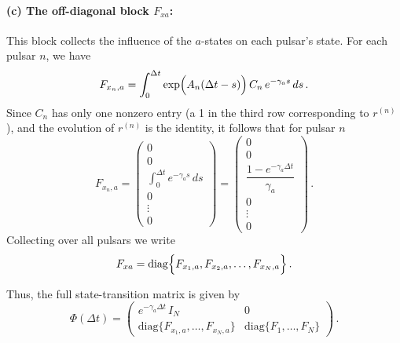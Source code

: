 \documentclass[]{scrartcl}
\begin{document}
	\paragraph{(c) The off-diagonal block \(F_{xa}\):}  
	This block collects the influence of the \(a\)-states on each pulsar’s state. For each pulsar \(n\), we have
	\begin{equation}
	F_{x_n,a} = \int_{0}^{\Delta t} \exp\Bigl(A_n (\Delta t-s)\Bigr) \, C_n \, e^{-\gamma_a s} \, ds\,.
	\end{equation}
	Since \(C_n\) has only one nonzero entry (a 1 in the third row corresponding to \(r^{(n)}\)), and the evolution of \(r^{(n)}\) is the identity, it follows that for pulsar \(n\)
	\begin{equation}
	F_{x_n,a} = \begin{pmatrix}
	0 \\[1mm]
	0 \\[1mm]
	\displaystyle \int_{0}^{\Delta t} e^{-\gamma_a s} \, ds \\[1mm]
	0 \\[1mm]
	\vdots \\[1mm]
	0
	\end{pmatrix}
	= \begin{pmatrix}
	0 \\[1mm]
	0 \\[1mm]
	\dfrac{1 - e^{-\gamma_a \Delta t}}{\gamma_a} \\[1mm]
	0 \\[1mm]
	\vdots \\[1mm]
	0
	\end{pmatrix}\,.
	\end{equation}
	Collecting over all pulsars we write
	\begin{equation}
	F_{xa} = \mathrm{diag}\Bigl\{ F_{x_1,a}, F_{x_2,a}, \dots, F_{x_N,a} \Bigr\}\,.
	\end{equation}
	
	Thus, the full state-transition matrix is given by
	\begin{equation}
	\boxed{
	\Phi(\Delta t) =
	\begin{pmatrix}
	e^{-\gamma_a \Delta t}\,I_N & 0 \\[1mm]
	\mathrm{diag}\{F_{x_1,a}, \dots, F_{x_N,a}\} & \mathrm{diag}\{F_1, \dots, F_N\}
	\end{pmatrix}\,.}
	\end{equation}
	
	
\end{document}
